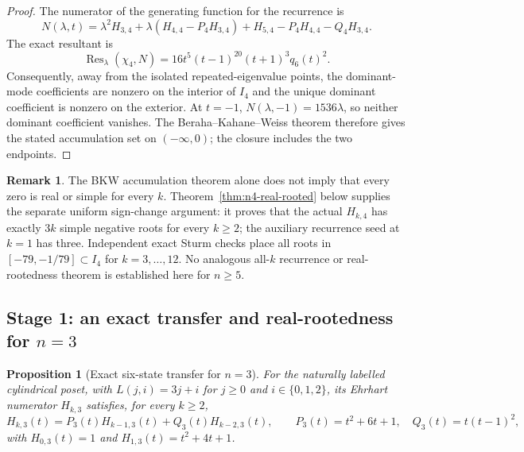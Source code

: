 \documentclass[11pt,a4paper]{article}
\newtheorem{proposition}[theorem]{Proposition}
\theoremstyle{definition}
\newtheorem{remark}[theorem]{Remark}
\begin{document}
\begin{proof}
The numerator of the generating function for the recurrence is
\[
N(\lambda,t)=\lambda^2H_{3,4}
+\lambda(H_{4,4}-P_4H_{3,4})
+H_{5,4}-P_4H_{4,4}-Q_4H_{3,4}.
\]
The exact resultant is
\[
\operatorname{Res}_\lambda(\chi_4,N)
=16t^5(t-1)^{20}(t+1)^3q_6(t)^2.
\]
Consequently, away from the isolated repeated-eigenvalue points, the
dominant-mode coefficients are nonzero on the interior of $I_4$ and
the unique dominant coefficient is nonzero on the exterior. At
$t=-1$, $N(\lambda,-1)=1536\lambda$, so neither dominant coefficient
vanishes. The Beraha--Kahane--Weiss theorem \cite{BerahaKahaneWeiss1975} therefore gives the stated
accumulation set on $(-\infty,0)$; the closure includes the two
endpoints.
\end{proof}

\begin{remark}
The BKW accumulation theorem alone does not imply that every zero is
real or simple for every $k$. Theorem~\ref{thm:n4-real-rooted} below
supplies the separate uniform sign-change argument: it proves that the
actual $H_{k,4}$ has exactly $3k$ simple negative roots for every
$k\ge2$; the auxiliary recurrence seed at $k=1$ has three. Independent
exact Sturm checks place all roots in
$[-79,-1/79]\subset I_4$ for $k=3,\ldots,12$. No analogous
all-$k$ recurrence or real-rootedness theorem is established here for
$n\ge5$.
\end{remark}

\subsection[Stage 1: exact transfer and real-rootedness for n=3]{Stage 1: an exact transfer and real-rootedness for $n=3$}
\label{sec:n3-real-rooted}

\begin{proposition}[Exact six-state transfer for $n=3$]
\label{prop:n3-transfer}
For the naturally labelled cylindrical poset, with
$L(j,i)=3j+i$ for $j\ge0$ and $i\in\{0,1,2\}$, its Ehrhart numerator
$H_{k,3}$ satisfies, for every $k\ge2$,
\[
H_{k,3}(t)=P_3(t)H_{k-1,3}(t)+Q_3(t)H_{k-2,3}(t),
\qquad P_3(t)=t^2+6t+1,\quad Q_3(t)=t(t-1)^2,
\]
with $H_{0,3}(t)=1$ and $H_{1,3}(t)=t^2+4t+1$.
\end{proposition}
\end{document}
